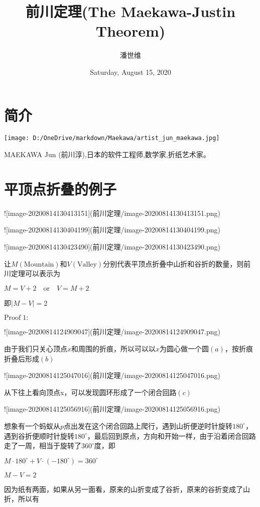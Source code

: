 \documentclass[a4paper,12pt]{article}
\begin{document}
\title {前川定理(The Maekawa-Justin Theorem)}
\author{潘世维}
\date{Saturday, August 15, 2020}
\maketitle
\section{简介} 
\texttt{[image: D:/OneDrive/markdown/Maekawa/artist\_jun\_maekawa.jpg]}

MAEKAWA Jun (前川淳),日本的软件工程师,数学家,折纸艺术家。

\section{平顶点折叠的例子}  

![image-20200814130413151](前川定理/image-20200814130413151.png)

![image-20200814130404199](前川定理/image-20200814130404199.png)

![image-20200814130423490](前川定理/image-20200814130423490.png)

让$M(\text{Mountain})$和$V(\text{Valley})$分别代表平顶点折叠中山折和谷折的数量，则前川定理可以表示为

$M = V +2 \quad \text{or}\quad V = M + 2$

即$|M-V|=2$

$\text{Proof}\;1:$

![image-20200814124909047](前川定理/image-20200814124909047.png)

由于我们只关心顶点$x$和周围的折痕，所以可以以$x$为圆心做一个圆$(a)$，按折痕折叠后形成$(b)$

![image-20200814125047016](前川定理/image-20200814125047016.png)

从下往上看向顶点x，可以发现圆环形成了一个闭合回路$(c)$

![image-20200814125056916](前川定理/image-20200814125056916.png)

想象有一个蚂蚁从$p$点出发在这个闭合回路上爬行，遇到山折便逆时针旋转$180^{\circ}$，遇到谷折便顺时针旋转$180^{\circ}$，最后回到原点，方向和开始一样，由于沿着闭合回路走了一周，相当于旋转了$360^{\circ}$度，即

$M · 180^{\circ} +V ·(−180^{\circ}) = 360^{\circ}$

$M − V = 2$

因为纸有两面，如果从另一面看，原来的山折变成了谷折，原来的谷折变成了山折，所以有
\end{document}

